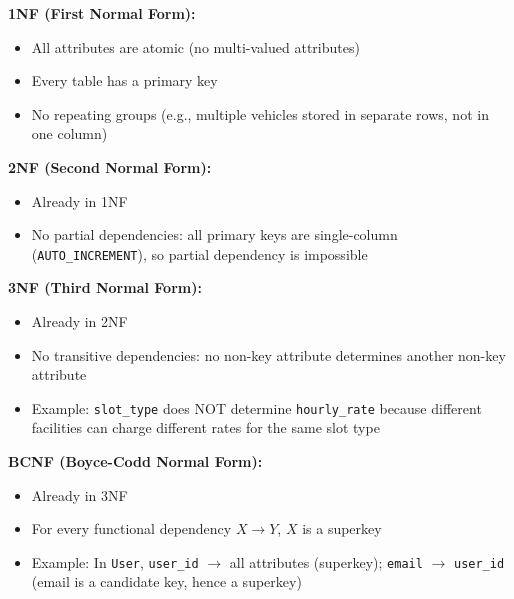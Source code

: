 \documentclass[12pt,a4paper]{article}
\begin{document}
\begin{questionbox}
\end{questionbox}
\begin{answerbox}
\textbf{1NF (First Normal Form):}
\begin{itemize}[nosep]
    \item All attributes are atomic (no multi-valued attributes)
    \item Every table has a primary key
    \item No repeating groups (e.g., multiple vehicles stored in separate rows, not in one column)
\end{itemize}

\textbf{2NF (Second Normal Form):}
\begin{itemize}[nosep]
    \item Already in 1NF
    \item No partial dependencies: all primary keys are single-column (\texttt{AUTO\_INCREMENT}), so partial dependency is impossible
\end{itemize}

\textbf{3NF (Third Normal Form):}
\begin{itemize}[nosep]
    \item Already in 2NF
    \item No transitive dependencies: no non-key attribute determines another non-key attribute
    \item Example: \texttt{slot\_type} does NOT determine \texttt{hourly\_rate} because different facilities can charge different rates for the same slot type
\end{itemize}

\textbf{BCNF (Boyce-Codd Normal Form):}
\begin{itemize}[nosep]
    \item Already in 3NF
    \item For every functional dependency $X \rightarrow Y$, $X$ is a superkey
    \item Example: In \texttt{User}, \texttt{user\_id} $\rightarrow$ all attributes (superkey); \texttt{email} $\rightarrow$ \texttt{user\_id} (email is a candidate key, hence a superkey)
\end{itemize}
\end{answerbox}
\end{document}
